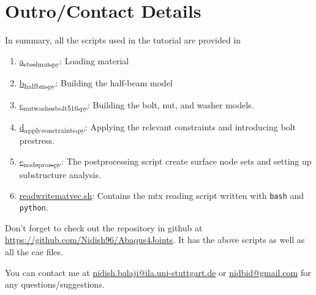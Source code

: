 \documentclass[11pt]{article}
\begin{document}
\section{Outro/Contact Details}
\label{sec:org94d30f6}
In summary, all the scripts used in the tutorial are provided in 
\begin{enumerate}
\item \href{https://github.com/Nidish96/Abaqus4Joints/blob/main/scripts/a\_steelmat.py}{a\textsubscript{steelmat.py}}: Loading material
\item \href{https://github.com/Nidish96/Abaqus4Joints/blob/main/scripts/b\_halfbm.py}{b\textsubscript{halfbm.py}}: Building the half-beam model
\item \href{https://github.com/Nidish96/Abaqus4Joints/blob/main/scripts/c\_nutwasherbolt\_516.py}{c\textsubscript{nutwasherbolt}\textsubscript{516.py}}: Building the bolt, nut, and washer models.
\item \href{https://github.com/Nidish96/Abaqus4Joints/blob/main/scripts/d\_applyconstraints.py}{d\textsubscript{applyconstraints.py}}: Applying the relevant constraints and introducing bolt prestress.
\item \href{https://github.com/Nidish96/Abaqus4Joints/blob/main/scripts/e\_nodeproc.py}{e\textsubscript{nodeproc.py}}: The postprocessing script create surface node sets and setting up substructure analysis.
\item \href{https://github.com/Nidish96/Abaqus4Joints/blob/main/scripts/readwritematvec.sh}{readwritematvec.sh}: Contains the mtx reading script written with \texttt{bash} and \texttt{python}.
\end{enumerate}

Don't forget to check out the repository in github at \href{https://github.com/Nidish96/Abaqus4Joints/blob/main/assets/assembly/model\_step3.cae}{https://github.com/Nidish96/Abaqus4Joints}.
It has the above scripts as well as all the cae files.

You can contact me at \href{mailto:nidish.balaji@ila.uni-stuttgart.de}{nidish.balaji@ila.uni-stuttgart.de} or \href{mailto:nidbid@gmail.com}{nidbid@gmail.com} for any questions/suggestions.
\end{document}
